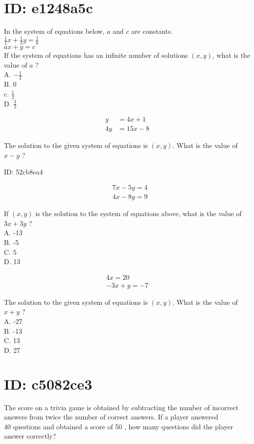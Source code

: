 \section*{ID: e1248a5c}
In the system of equations below, $a$ and $c$ are constants.\\
$\frac{1}{2} x+\frac{1}{3} y=\frac{1}{6}$\\
$a x+y=c$\\
If the system of equations has an infinite number of solutions $(x, y)$, what is the value of $a$ ?\\
A. $-\frac{1}{2}$\\
B. 0\\
c. $\frac{1}{2}$\\
D. $\frac{3}{2}$

$$
\begin{aligned}
y & =4 x+1 \\
4 y & =15 x-8
\end{aligned}
$$

The solution to the given system of equations is $(x, y)$. What is the value of $x-y$ ?

ID: 52cb8ea4

$$
\begin{aligned}
& 7 x-5 y=4 \\
& 4 x-8 y=9
\end{aligned}
$$

If $(x, y)$ is the solution to the system of equations above, what is the value of $3 x+3 y$ ?\\
A. -13\\
B. -5\\
C. 5\\
D. 13

$$
\begin{gathered}
4 x=20 \\
-3 x+y=-7
\end{gathered}
$$

The solution to the given system of equations is $(x, y)$. What is the value of $x+y$ ?\\
A. -27\\
B. -13\\
C. 13\\
D. 27

\section*{ID: c5082ce3}
The score on a trivia game is obtained by subtracting the number of incorrect answers from twice the number of correct answers. If a player answered\\
40 questions and obtained a score of 50 , how many questions did the player answer correctly?

